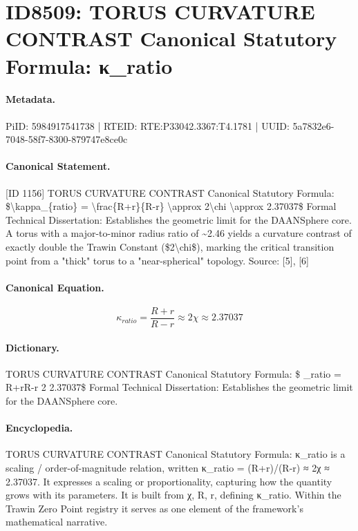 \section*{ID8509: TORUS CURVATURE CONTRAST Canonical Statutory Formula: κ\_ratio}
\paragraph{Metadata.}
PiID: 5984917541738 | RTEID: RTE:P33042.3367:T4.1781 | UUID: 5a7832e6-7048-58f7-8300-879747e8ce0c

\paragraph{Canonical Statement.}
[ID 1156] TORUS CURVATURE CONTRAST Canonical Statutory Formula: \$\textbackslash{}kappa\_\{ratio\} = \textbackslash{}frac\{R+r\}\{R-r\} \textbackslash{}approx 2\textbackslash{}chi \textbackslash{}approx 2.37037\$ Formal Technical Dissertation: Establishes the geometric limit for the DAANSphere core. A torus with a major-to-minor radius ratio of \textasciitilde{}2.46 yields a curvature contrast of exactly double the Trawin Constant (\$2\textbackslash{}chi\$), marking the critical transition point from a "thick" torus to a "near-spherical" topology. Source: [5], [6]

\paragraph{Canonical Equation.}
\[
\kappa_{ratio} = \frac{R+r}{R-r} \approx 2\chi \approx 2.37037
\]

\paragraph{Dictionary.}
TORUS CURVATURE CONTRAST Canonical Statutory Formula: \$ \_ratio = R+rR-r 2 2.37037\$ Formal Technical Dissertation: Establishes the geometric limit for the DAANSphere core.

\paragraph{Encyclopedia.}
TORUS CURVATURE CONTRAST Canonical Statutory Formula: κ\_ratio is a scaling / order-of-magnitude relation, written κ\_ratio = (R+r)/(R-r) ≈ 2χ ≈ 2.37037. It expresses a scaling or proportionality, capturing how the quantity grows with its parameters. It is built from χ, R, r, defining κ\_ratio. Within the Trawin Zero Point registry it serves as one element of the framework's mathematical narrative.
